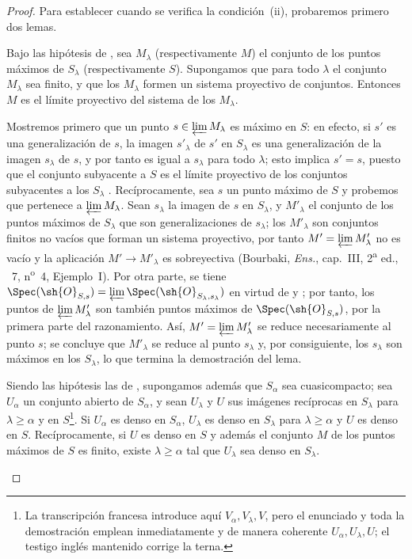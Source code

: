 \begin{proof}
Para establecer  cuando se verifica la condición~(ii), probaremos primero dos lemas.

\begin{lemma}[20.3.8.3]
\label{IV.20.3.8.3}
Bajo las hipótesis de , sea $M_\lambda$ \textup{(respectivamente $M$)} el conjunto de los puntos máximos de $S_\lambda$ \textup{(respectivamente $S$)}.
Supongamos que para todo $\lambda$ el conjunto $M_\lambda$ sea finito, y que los $M_\lambda$ formen un sistema proyectivo de conjuntos.
Entonces $M$ es el límite proyectivo del sistema de los $M_\lambda$.
\end{lemma}

Mostremos primero que un punto $s\in\varprojlim M_\lambda$ es máximo en $S$: en efecto, si $s'$ es una generalización de $s$, la imagen $s'_\lambda$ de $s'$ en $S_\lambda$ es una generalización de la imagen $s_\lambda$ de $s$, y por tanto es igual a $s_\lambda$ para todo $\lambda$; esto implica $s'=s$, puesto que el conjunto subyacente a $S$ es el límite proyectivo de los conjuntos subyacentes a los $S_\lambda$ .
Recíprocamente, sea $s$ un punto máximo de $S$ y probemos que pertenece a $\varprojlim M_\lambda$.
Sean $s_\lambda$ la imagen de $s$ en $S_\lambda$, y $M'_\lambda$ el conjunto de los puntos máximos de $S_\lambda$ que son generalizaciones de $s_\lambda$; los $M'_\lambda$ son conjuntos finitos no vacíos que forman un sistema proyectivo, por tanto $M'=\varprojlim M'_\lambda$ no es vacío y la aplicación $M'\to M'_\lambda$ es sobreyectiva (Bourbaki, \emph{Ens.}, cap.~III, 2\textsuperscript{a} ed., \textsection~7, n\textsuperscript{o}~4, Ejemplo~I).
Por otra parte, se tiene $\Spec(\sh{O}_{S,s})=\varprojlim\Spec(\sh{O}_{S_\lambda,s_\lambda})$ en virtud de  y ; por tanto, los puntos de $\varprojlim M'_\lambda$ son también puntos máximos de $\Spec(\sh{O}_{S,s})$, por la primera parte del razonamiento.
Así, $M'=\varprojlim M'_\lambda$ se reduce necesariamente al punto $s$; se concluye que $M'_\lambda$ se reduce al punto $s_\lambda$ y, por consiguiente, los $s_\lambda$ son máximos en los $S_\lambda$, lo que termina la demostración del lema.

\begin{lemma}[20.3.8.4]
\label{IV.20.3.8.4}
Siendo las hipótesis las de , supongamos además que $S_\alpha$ sea cuasicompacto; sea $U_\alpha$ un conjunto abierto de $S_\alpha$, y sean $U_\lambda$ y $U$ sus imágenes recíprocas en $S_\lambda$ para $\lambda\geq\alpha$ y en $S$\footnote{La transcripción francesa introduce aquí $V_\alpha,V_\lambda,V$, pero el enunciado y toda la demostración emplean inmediatamente y de manera coherente $U_\alpha,U_\lambda,U$; el testigo inglés mantenido corrige la terna.}.
Si $U_\alpha$ es denso en $S_\alpha$, $U_\lambda$ es denso en $S_\lambda$ para $\lambda\geq\alpha$ y $U$ es denso en $S$.
Recíprocamente, si $U$ es denso en $S$ y además el conjunto $M$ de los puntos máximos de $S$ es finito, existe $\lambda\geq\alpha$ tal que $U_\lambda$ sea denso en $S_\lambda$.
\end{lemma}


\end{proof}
